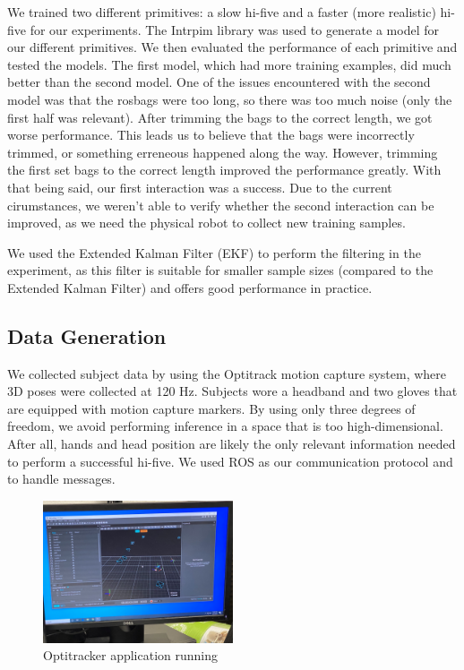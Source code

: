 \documentclass[letterpaper, 10 pt, conference]{ieeeconf}  %
\begin{document}
We trained two different primitives: a slow hi-five and a faster (more realistic) hi-five for our experiments. The Intrpim library was used to generate a model for our different primitives. We then evaluated the performance of each primitive and tested the models. The first model, which had more training examples, did much better than the second model. One of the issues encountered with the second model was that the rosbags were too long, so there was too much noise (only the first half was relevant). After trimming the bags to the correct length, we got worse performance. This leads us to believe that the bags were incorrectly trimmed, or something erreneous happened along the way. However, trimming the first set bags to the correct length improved the performance greatly. With that being said, our first interaction was a success. Due to the current cirumstances, we weren't able to verify whether the second interaction can be improved, as we need the physical robot to collect new training samples.

We used the Extended Kalman Filter (EKF) to perform the filtering in the experiment, as this filter is suitable for smaller sample sizes (compared to the Extended Kalman Filter) and offers good performance in practice.

\subsection{Data Generation}
We collected subject data by using the Optitrack motion capture system, where 3D poses were collected at 120 Hz. Subjects wore a headband and two gloves that are equipped with motion capture markers. By using only three degrees of freedom, we avoid performing inference in a space that is too high-dimensional. After all, hands and head position are likely the only relevant information needed to perform a successful hi-five. We used ROS as our communication protocol and to handle messages.

\begin{figure}[h]
\centering
\includegraphics[width=0.5\textwidth]{Optitracker.jpg}
\caption{Optitracker application running}
\end{figure}
\end{document}
